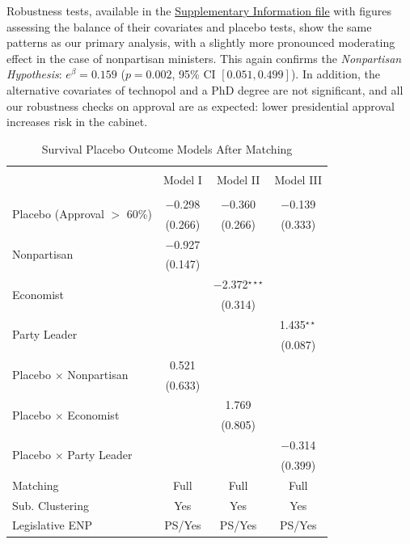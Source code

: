 \documentclass[12pt,halfline,a4paper]{ouparticle}
\begin{document}
Robustness tests, available in the \href{https://osf.io/asgbj/?view_only=144acd6c8eca4836880b57dee85ea4ff}{Supplementary Information file} with figures assessing the balance of their covariates and placebo tests, show the same patterns as our primary analysis, with a slightly more pronounced moderating effect in the case of nonpartisan ministers. This again confirms the {\itshape Nonpartisan Hypothesis}: $e^{\beta} = 0.159$ ($p = 0.002$, 95\% CI  $[0.051, 0.499]$). In addition, the alternative covariates of technopol and a PhD degree are not significant, and all our robustness checks on approval are as expected: lower presidential approval increases risk in the cabinet.

\begin{table}[!htbp] \centering 
  \caption{Survival Placebo Outcome Models After Matching} 
  \label{TAB3} 
\begin{tabular}{@{\extracolsep{5pt}}lccc} 
\\[-1.8ex] \hline \\[-1.8ex] 
 & Model I & Model II & Model III \\ 
\midrule\\[-1.8ex] 
  \multirow{2}{*}{Placebo (Approval $>$ 60\%)} & $-$0.298 & $-$0.360 & $-$0.139 \\ 
  & (0.266) & (0.266) & (0.333) \\ 
  \multirow{2}{*}{Nonpartisan} & $-$0.927 &  &  \\ 
  & (0.147) &  &  \\ 
  \multirow{2}{*}{Economist} &  & $-$2.372$^{\star\star\star}$ &  \\ 
  &  & (0.314) &  \\ 
  \multirow{2}{*}{Party Leader} &  &  & 1.435$^{\star\star}$ \\ 
  &  &  & (0.087) \\ 
  \multirow{2}{*}{Placebo $\times$ Nonpartisan} & 0.521 &  &  \\ 
  & (0.633) &  &  \\ 
  \multirow{2}{*}{Placebo $\times$ Economist} &  & 1.769 &  \\ 
  &  & (0.805) &  \\ 
  \multirow{2}{*}{Placebo $\times$ Party Leader} &  &  & $-$0.314 \\ 
  &  &  & (0.399) \\ \midrule
 Matching & Full & Full & Full \\ 
Sub. Clustering & Yes & Yes & Yes \\ \midrule
Legislative ENP & PS/Yes & PS/Yes & PS/Yes \\ 

\end{tabular}
\end{table}
\end{document}
